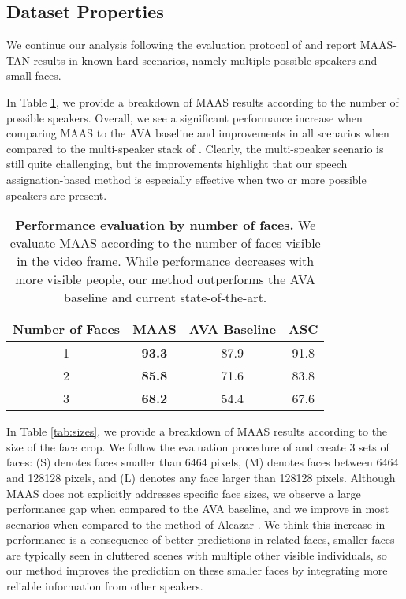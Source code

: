 \documentclass[10pt,twocolumn,letterpaper]{article}
\begin{document}
\subsection{Dataset Properties}
We continue our analysis following the evaluation protocol of \cite{roth2019ava} and report MAAS-TAN results in known hard scenarios, namely  multiple possible speakers and small faces.

In Table \ref{tab:scenarios}, we provide a breakdown of MAAS results according to the number of possible speakers. Overall, we see a significant performance increase when comparing MAAS to the AVA baseline \cite{roth2019ava} and improvements in all scenarios when compared to the multi-speaker stack of  \cite{alcazar2020active}. Clearly, the multi-speaker scenario is still quite challenging, but the improvements highlight that our speech assignation-based method is especially effective when two or more possible speakers are present. 

\begin{table}[h]
    \small
    \centering
    \begin{tabular}{c c c c }
        \hline
        \textbf{Number of Faces}  & \textbf{MAAS}  & \textbf{AVA Baseline} \cite{roth2019ava} & \textbf{ASC} \cite{alcazar2020active} \\
        \hline 
        1 & \textbf{93.3} & 87.9 & 91.8 \\
        2 & \textbf{85.8} & 71.6 & 83.8 \\
        3 & \textbf{68.2} & 54.4 & 67.6 \\
        \hline
    \end{tabular}
    
    \caption{\textbf{Performance evaluation by number of faces.} 
    We evaluate MAAS according to the number of  faces visible in the video frame. While performance decreases with more visible people, our method outperforms the AVA baseline and current state-of-the-art.
    }
    \label{tab:scenarios}
\end{table} 
In Table \ref{tab:sizes}, we provide a breakdown of MAAS results according to the size of the face crop. We follow the evaluation procedure of \cite{roth2019ava} and create 3 sets of faces: (S) denotes faces smaller than 6464 pixels, (M) denotes faces between 6464 and 128128 pixels, and (L) denotes any face larger than 128128 pixels. Although MAAS does not explicitly addresses specific face sizes, we observe a large performance gap when compared to the AVA baseline, and we improve in most scenarios when compared to the method of Alcazar \etal \cite{alcazar2020active}. We think this increase in performance is a consequence of better predictions in related faces, \ie smaller faces are typically seen in cluttered scenes with multiple other visible individuals, so our method improves the prediction on these smaller faces by integrating more reliable information from other speakers.
\end{document}
